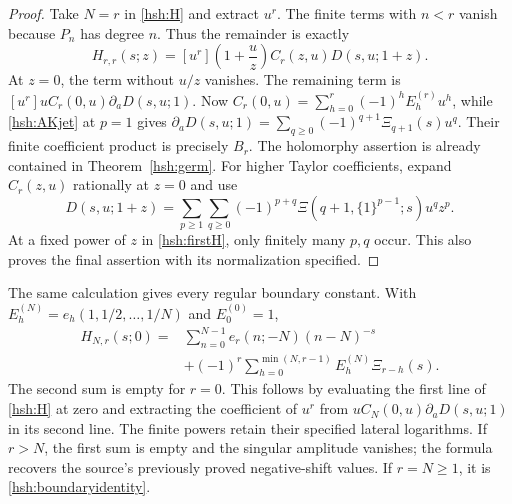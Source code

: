 \documentclass[11pt,a4paper]{article}
\numberwithin{equation}{section}
\theoremstyle{definition}
\theoremstyle{remark}
\begin{document}
\begin{proof}
Take $N=r$ in \eqref{hsh:H} and extract $u^r$.  The finite terms
with $n<r$ vanish because $P_n$ has degree $n$.  Thus the remainder
is exactly
\begin{equation}\label{hsh:firstH}
 H_{r,r}(s;z)=[u^r]\left(1+\frac uz\right)
                          C_r(z,u)D(s,u;1+z).
\end{equation}
At $z=0$, the term without $u/z$ vanishes.  The remaining term is
$[u^r]uC_r(0,u)\partial_aD(s,u;1)$.
Now $C_r(0,u)=\sum_{h=0}^r(-1)^hE_h^{(r)}u^h$, while
\eqref{hsh:AKjet} at $p=1$ gives
$\partial_aD(s,u;1)=\sum_{q\geq0}(-1)^{q+1}\Xi_{q+1}(s)u^q$.
Their finite coefficient product is precisely $B_r$.
The holomorphy assertion is already contained in
Theorem~\ref{hsh:germ}.  For higher Taylor coefficients, expand
$C_r(z,u)$ rationally at $z=0$ and use
\[
 D(s,u;1+z)=\sum_{p\geq1}\sum_{q\geq0}
       (-1)^{p+q}\Xi(q+1,\{1\}^{p-1};s)u^qz^p.
\]
At a fixed power of $z$ in \eqref{hsh:firstH}, only finitely many
$p,q$ occur.  This also proves the final assertion with its
normalization specified.
\end{proof}

The same calculation gives every regular boundary constant.  With
$E_h^{(N)}=e_h(1,1/2,\ldots,1/N)$ and $E_0^{(0)}=1$,
\begin{equation}\label{hsh:allregular}
 \begin{split}
 H_{N,r}(s;0)={}&\sum_{n=0}^{N-1}e_r(n;-N)(n-N)^{-s}\\
 &+(-1)^r\sum_{h=0}^{\min(N,r-1)}E_h^{(N)}\Xi_{r-h}(s).
 \end{split}
\end{equation}
The second sum is empty for $r=0$.  This follows by evaluating the
first line of \eqref{hsh:H} at zero and extracting the coefficient
of $u^r$ from $uC_N(0,u)\partial_aD(s,u;1)$ in its second line.
The finite powers retain their specified lateral logarithms.  If
$r>N$, the first sum is empty and the singular amplitude vanishes;
the formula recovers the source's previously proved negative-shift
values.  If $r=N\geq1$, it is \eqref{hsh:boundaryidentity}.
\end{document}
